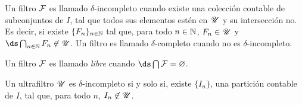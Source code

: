 \begin{definition}
  Un filtro $\mathcal{F}$ es llamado $\delta$-incompleto cuando existe una colección
  contable de subconjuntos de $I$, tal que todos sus elementos estén en $\mathscr{U}$ y
  su intersección no. Es decir, si existe $\{F_n\}_{n\in\mathbb{N}}$ tal que,
  para todo $n\in\mathbb{N}$, $F_n\in\mathscr{U}$ y $\ds\bigcap_{n\in\N}F_n \not\in \U$. Un filtro
  es llamado $\delta$-completo cuando no es $\delta$-incompleto.
\end{definition}

\begin{definition}
  Un filtro $\mathcal{F}$ es llamado \emph{libre} cuando $\ds\bigcap\F = \varnothing$.
\end{definition}

\begin{theorem}[Caracterización]
  Un ultrafiltro $\mathscr{U}$ es $\delta$-incompleto si y solo si, existe
  $\{I_n\}$, una partición contable de $I$, tal que, para todo $n$,
  $I_n\not\in\mathscr{U}$.
\end{theorem}

